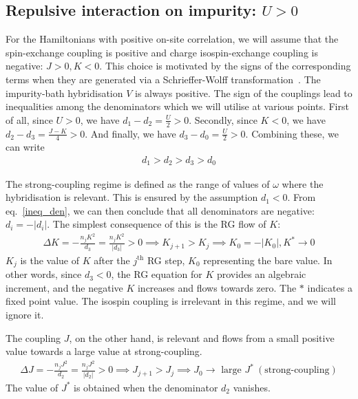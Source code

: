 \documentclass{report}
\numberwithin{equation}{section}
\begin{document}
\subsection{Repulsive interaction on impurity: \(U>0\)}
For the Hamiltonians with positive on-site correlation, we will assume that the spin-exchange coupling is positive and charge isospin-exchange coupling is negative: \(J>0, K<0\). This choice is motivated by the signs of the corresponding terms when they are generated via a Schrieffer-Wolff transformation~\cite{schrieffer1966}. The impurity-bath hybridisation \(V\) is always positive. The sign of the couplings lead to inequalities among the denominators which we will utilise at various points. First of all, since \(U>0\), we have \(d_1 - d_2 = \frac{U}{2} > 0\). Secondly, since \(K<0\), we have \(d_2 - d_3 = \frac{J-K}{4} > 0\). And finally, we have \(d_3 - d_0 = \frac{U}{2} > 0\). Combining these, we can write
\begin{equation}\begin{aligned}
	\label{ineq_den}
	d_1 > d_2 > d_3 > d_0
\end{aligned}\end{equation}

The strong-coupling regime is defined as the range of values of \(\omega\) where the hybridisation is relevant. This is ensured by the assumption \(d_1<0\). From eq.~\ref{ineq_den}, we can then conclude that all denominators are negative: \(d_i = - |d_i|\). The simplest consequence of this is the RG flow of \(K\):
\begin{equation}\begin{aligned}
	\Delta K= -\frac{n_j K^2}{d_3} = \frac{n_j K^2}{|d_3|} > 0 \implies K_{j+1} > K_j \implies K_0 = -|K_0|, K^* \to 0
\end{aligned}\end{equation}
\(K_j\) is the value of \(K\) after the \(j^\text{th}\) RG step, \(K_0\) representing the bare value.
In other words, since \(d_3 < 0\), the RG equation for \(K\) provides an algebraic increment, and the negative \(K\) increases and flows towards zero. The \(*\) indicates a fixed point value. The isospin coupling is irrelevant in this regime, and we will ignore it.

The coupling \(J\), on the other hand, is relevant and flows from a small positive value towards a large value at strong-coupling.
\begin{equation}\begin{aligned}
	\Delta J= -\frac{n_j J^2}{d_2} = \frac{n_j J^2}{|d_2|} > 0 \implies J_{j+1} > J_j \implies J_0 \to \text{ large } J^* ~(\text{strong-coupling})
\end{aligned}\end{equation}
The value of \(J^*\) is obtained when the denominator \(d_2\) vanishes.
\end{document}
